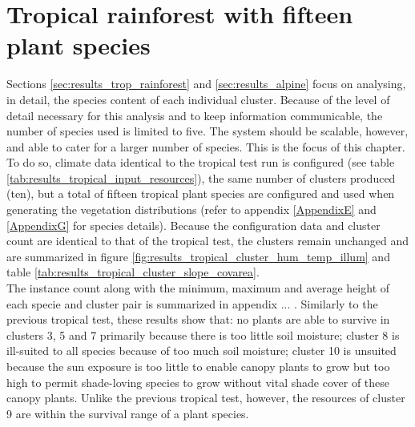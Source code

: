 \section{Tropical rainforest with fifteen plant species}

Sections \ref{sec:results_trop_rainforest} and \ref{sec:results_alpine} focus on analysing, in detail, the species content of each individual cluster. Because of the level of detail necessary for this analysis and to keep information communicable, the number of species used is limited to five. The system should be scalable, however, and able to cater for a larger number of species. This is the focus of this chapter. To do so, climate data identical to the tropical test run is configured (see table \ref{tab:results_tropical_input_resources}), the same number of clusters produced (ten), but a total of fifteen tropical plant species are configured and used when generating the vegetation distributions (refer to appendix \ref{AppendixE} and \ref{AppendixG} for species details). Because the configuration data and cluster count are identical to that of the tropical test, the clusters remain unchanged and are summarized in figure \ref{fig:results_tropical_cluster_hum_temp_illum} and table \ref{tab:results_tropical_cluster_slope_covarea}.\\

The instance count along with the minimum, maximum and average height of each specie and cluster pair is summarized in appendix ... . Similarly to the previous tropical test, these results show that: no plants are able to survive in clusters 3, 5 and 7 primarily because there is too little soil moisture; cluster 8 is ill-suited to all species because of too much soil moisture; cluster 10 is unsuited because the sun exposure is too little to enable canopy plants to grow but too high to permit shade-loving species to grow without vital shade cover of these canopy plants. Unlike the previous tropical test, however, the resources of cluster 9 are within the survival range of a plant species.\\

